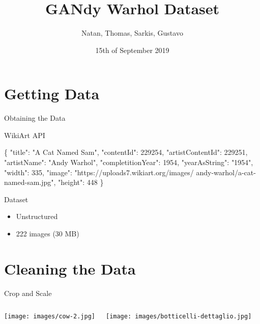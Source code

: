 \documentclass[
  ignorenonframetext,
]{beamer}
\title{GANdy Warhol Dataset}
\author{Natan, Thomas, Sarkis, Gustavo}
\date{15th of September 2019}
\newenvironment{Shaded}{}{}
\newcommand{\DataTypeTok}[1]{\textcolor[rgb]{0.56,0.13,0.00}{#1}}
\newcommand{\DecValTok}[1]{\textcolor[rgb]{0.25,0.63,0.44}{#1}}
\newcommand{\FunctionTok}[1]{\textcolor[rgb]{0.02,0.16,0.49}{#1}}
\newcommand{\StringTok}[1]{\textcolor[rgb]{0.25,0.44,0.63}{#1}}
\providecommand{\tightlist}{%
  \setlength{\itemsep}{0pt}\setlength{\parskip}{0pt}}
\begin{document}
\frame{\titlepage}

\section{Getting Data}
\begin{frame}[fragile]{Obtaining the Data}
\protect\hypertarget{obtaining-the-data}{}

WikiArt API

\footnotesize

\begin{Shaded}
\begin{Highlighting}[]
\FunctionTok{\{}
  \DataTypeTok{"title"}\FunctionTok{:} \StringTok{"A Cat Named Sam"}\FunctionTok{,}
  \DataTypeTok{"contentId"}\FunctionTok{:} \DecValTok{229254}\FunctionTok{,}
  \DataTypeTok{"artistContentId"}\FunctionTok{:} \DecValTok{229251}\FunctionTok{,}
  \DataTypeTok{"artistName"}\FunctionTok{:} \StringTok{"Andy Warhol"}\FunctionTok{,}
  \DataTypeTok{"completitionYear"}\FunctionTok{:} \DecValTok{1954}\FunctionTok{,}
  \DataTypeTok{"yearAsString"}\FunctionTok{:} \StringTok{"1954"}\FunctionTok{,}
  \DataTypeTok{"width"}\FunctionTok{:} \DecValTok{335}\FunctionTok{,}
  \DataTypeTok{"image"}\FunctionTok{:} \StringTok{"https://uploads7.wikiart.org/images/}
\StringTok{                    andy{-}warhol/a{-}cat{-}named{-}sam.jpg"}\FunctionTok{,}
  \DataTypeTok{"height"}\FunctionTok{:} \DecValTok{448}
\FunctionTok{\}}
\end{Highlighting}
\end{Shaded}

\end{frame}

\begin{frame}{Dataset}
\protect\hypertarget{dataset}{}

\begin{itemize}
\tightlist
\item
  Unstructured
\item
  222 images (30 MB)
\end{itemize}

\end{frame}

\section{Cleaning the Data}
\begin{frame}{Crop and Scale}
\protect\hypertarget{crop-and-scale}{}

\begin{columns}
\texttt{[image: images/cow-2.jpg]}

\texttt{[image: images/botticelli-dettaglio.jpg]}
\end{columns}
\end{frame}
\end{document}
